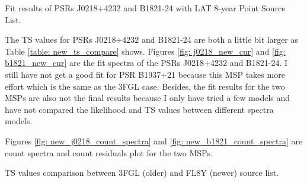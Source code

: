 \documentclass[12pt]{report}
\newcommand{\mycaption}[1]{\protect \caption{#1}}
\begin{document}
    \begin{table}[!htp]
      \centering
        \mycaption{Fit results of PSRs J0218+4232 and B1821-24 with LAT 8-year Point 
          Source List.}
        \label{table: new_results_all_three}        
    \end{table}  
  
    The TS values for PSRs J0218+4232 and B1821-24 are both a little bit larger as Table 
    \ref{table: new_ts_compare} shows. Figures \ref{fig: j0218_new_cur} and 
    \ref{fig: b1821_new_cur} are the fit spectra of the PSRs
    J0218+4232 and B1821-24. I still have not get a good fit for PSR B1937+21 because this 
    MSP takes more effort which is the same as the 3FGL case. Besides, the fit 
    results for the two MSPs are also not the final results because I only have tried a 
    few models and have not compared the likelihood and TS values between different 
    spectra models. 

    Figures \ref{fig: new_j0218_count_spectra} and \ref{fig: new_b1821_count_spectra} are 
    count spectra and count residuals plot for the two MSPs. 
    \begin{table}[!htp]
      \centering
        \mycaption{TS values comparison between 3FGL (older) and FL8Y (newer) source list.}
        \label{table: new_ts_compare}        
    \end{table}  
    
\end{document}
